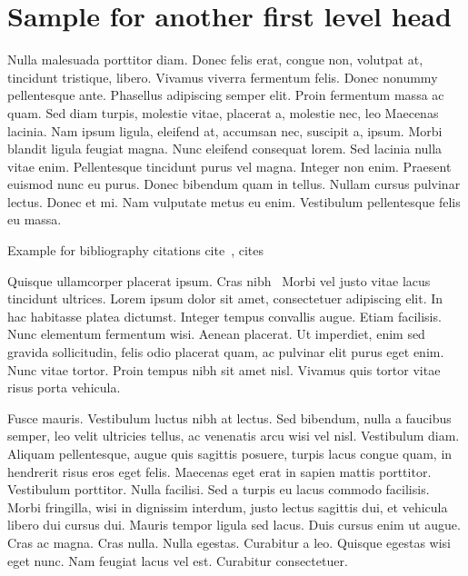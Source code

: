 \documentclass[AMS,STIX2COL]{WileyNJD-v2}
\begin{document}
    \section{Sample for another first level head \cite{Rothermel1998}}\label{sec2}

    Nulla malesuada porttitor diam. Donec felis erat, congue non, volutpat at, tincidunt tristique, libero. Vivamus viverra
    fermentum felis. Donec nonummy pellentesque ante. Phasellus adipiscing semper elit. Proin fermentum massa ac
    quam. Sed diam turpis, molestie vitae, placerat a, molestie nec, leo \cite{Elbaum2002} Maecenas lacinia. Nam ipsum ligula, eleifend
    at, accumsan nec, suscipit a, ipsum. Morbi blandit ligula feugiat magna. Nunc eleifend consequat lorem. Sed lacinia
    nulla vitae enim. Pellentesque tincidunt purus vel magna. Integer non enim. Praesent euismod nunc eu purus. Donec
    bibendum quam in tellus. Nullam cursus pulvinar lectus. Donec et mi. Nam vulputate metus eu enim. Vestibulum
    pellentesque felis eu massa.

    Example for bibliography citations cite~\citep{Elbaum2002}, cites~\cite{Allen2011,Yoo2007}

    Quisque ullamcorper placerat ipsum. Cras nibh~\cite{Yoo2007,Schulz2012} Morbi vel justo vitae lacus tincidunt ultrices. Lorem ipsum dolor sit
    amet, consectetuer adipiscing elit. In hac habitasse platea dictumst. Integer tempus convallis augue. Etiam facilisis.
    Nunc elementum fermentum wisi. Aenean placerat. Ut imperdiet, enim sed gravida sollicitudin, felis odio placerat
    quam, ac pulvinar elit purus eget enim. Nunc vitae tortor. Proin tempus nibh sit amet nisl. Vivamus quis tortor
    vitae risus porta vehicula.

    Fusce mauris. Vestibulum luctus nibh at lectus. Sed bibendum, nulla a faucibus semper, leo velit ultricies tellus, ac
    venenatis arcu wisi vel nisl. Vestibulum diam. Aliquam pellentesque, augue quis sagittis posuere, turpis lacus congue
    quam, in hendrerit risus eros eget felis. Maecenas eget erat in sapien mattis porttitor. Vestibulum porttitor. Nulla facilisi. Sed a turpis eu lacus commodo facilisis. Morbi fringilla, wisi in dignissim interdum, justo lectus sagittis dui, et
    vehicula libero dui cursus dui. Mauris tempor ligula sed lacus. Duis cursus enim ut augue. Cras ac magna. Cras nulla.
    Nulla egestas. Curabitur a leo. Quisque egestas wisi eget nunc. Nam feugiat lacus vel est. Curabitur consectetuer.
\end{document}
